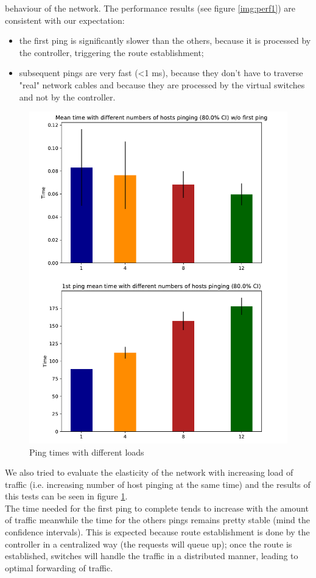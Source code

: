behaviour of the network.
The performance results (see figure \ref{img:perf1}) are consistent with our expectation:
\begin{itemize}
    \item the first ping is significantly slower than the others, because it is processed by the controller, triggering the route establishment;
    \item subsequent pings are very fast (<1 ms), because they don't have to traverse "real" network cables and because they are processed by the virtual switches and not by the controller.
\end{itemize}
\newpage
\begin{figure}[h]
    \centering
    \includegraphics[width=.94\textwidth]{img/increasing_ping_time.pdf}
    \caption{Ping times with different loads}
    \label{img:perf2}
\end{figure}
\noindent We also tried to evaluate the elasticity of the network with increasing load of traffic (i.e. increasing number of host pinging at the same time) and the results of this tests can be seen in figure \ref{img:perf2}.\\
The time needed for the first ping to complete tends to increase with the amount of traffic meanwhile the time for the others pings remains pretty stable
(mind the confidence intervals). This is expected because route establishment is done by the controller in a centralized way (the requests will queue up);
once the route is established, switches will handle the traffic in a distributed manner, leading to optimal forwarding of traffic.
